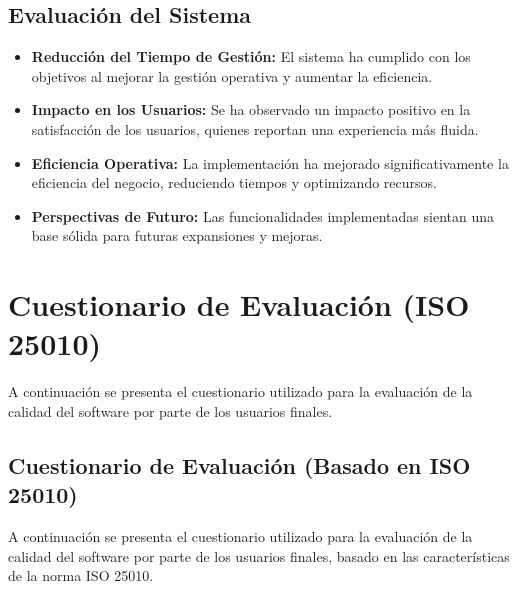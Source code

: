 \documentclass[conference]{IEEEtran}
\begin{document}
\subsection{Evaluación del Sistema}
\begin{itemize}
    \item \textbf{Reducción del Tiempo de Gestión:} El sistema ha cumplido con los objetivos al mejorar la gestión operativa y aumentar la eficiencia.
    \item \textbf{Impacto en los Usuarios:} Se ha observado un impacto positivo en la satisfacción de los usuarios, quienes reportan una experiencia más fluida.
    \item \textbf{Eficiencia Operativa:} La implementación ha mejorado significativamente la eficiencia del negocio, reduciendo tiempos y optimizando recursos.
    \item \textbf{Perspectivas de Futuro:} Las funcionalidades implementadas sientan una base sólida para futuras expansiones y mejoras.
\end{itemize}

\section{Cuestionario de Evaluación (ISO 25010)}
A continuación se presenta el cuestionario utilizado para la evaluación de la calidad del software por parte de los usuarios finales.
\subsection{Cuestionario de Evaluación (Basado en ISO 25010)}
A continuación se presenta el cuestionario utilizado para la evaluación de la calidad del software por parte de los usuarios finales, basado en las características de la norma ISO 25010.
\end{document}
